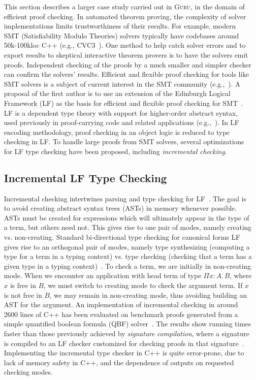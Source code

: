 \documentclass[9pt,natbib]{sigplanconf}
\newcommand{\guru}[0]{\textsc{Guru}}
\begin{document}
This section describes a larger case study carried out in \guru, in
the domain of efficient proof checking.  In automated theorem proving,
the complexity of solver implementations limits trustworthiness of
their results.  For example, modern SMT (Satisfiability Modulo
Theories) solvers typically have codebases around 50k-100kloc C++
(e.g., \textsc{CVC3}~\cite{BT07}).  One method to help catch solver
errors and to export results to skeptical interactive theorem provers
is to have the solvers emit proofs.  Independent checking of the
proofs by a much smaller and simpler checker can confirm the solvers'
results.  Efficient and flexible proof checking for tools like SMT
solvers is a subject of current interest in the SMT community
(e.g.,~\cite{moskal08}).  A proposal of the first author is to use an
extension of the Edinburgh Logical Framework (LF) as the basis for
efficient and flexible proof checking for SMT~\cite{SO08,HHP93}.  LF
is a dependent type theory with support for higher-order abstract
syntax, used previously in proof-carrying code and related
applications (e.g.,~\cite{A01,N97}).  In LF encoding methodology,
proof checking in an object logic is reduced to type checking in LF.
To handle large proofs from SMT solvers, several optimizations for LF
type checking have been proposed, including \emph{incremental
checking}.

\subsection{Incremental LF Type Checking}

Incremental checking intertwines parsing and type checking for
LF~\cite{stump08b}.  The goal is to avoid creating abstract syntax
trees (ASTs) in memory whenever possible.  ASTs must be created for
expressions which will ultimately appear in the type of a term, but
others need not.  This gives rise to one pair of modes, namely
creating vs. non-creating.  Standard bi-directional type checking for
canonical forms LF gives rise to an orthogonal pair of modes, namely
type synthesizing (computing a type for a term in a typing context)
vs. type checking (checking that a term has a given type in a typing
context)~\cite{clf02,pierce98local}.  To check a term, we are
initially in non-creating mode.  When we encounter an application with
head term of type $\Pi x : A.\, B$, where $x$ is free in $B$, we must
switch to creating mode to check the argument term.  If $x$ is not
free in $B$, we may remain in non-creating mode, thus avoiding
building an AST for the argument.  An implementation of incremental
checking in around 2600 lines of C++ has been evaluated on benchmark
proofs generated from a simple quantified boolean formula (QBF)
solver~\cite{stump08b}.  The results show running times faster than
those previously achieved by \emph{signature compilation}, where a
signature is compiled to an LF checker customized for checking proofs
in that signature~\cite{zeller07}.  Implementing the incremental type
checker in C++ is quite error-prone, due to lack of memory safety in
C++, and the dependence of outputs on requested checking modes.
\end{document}
